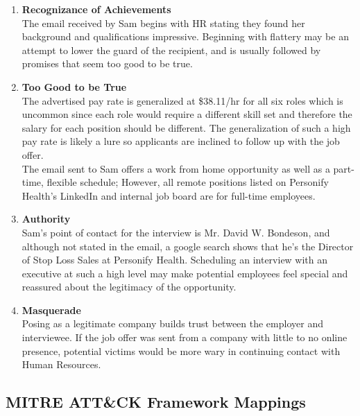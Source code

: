 \begin{fullwidth}
\begin{enumerate}
    \item \textbf{Recognizance of Achievements}
            \\\medskip
                The email received by Sam begins with HR stating they found her background and qualifications impressive. Beginning with flattery may be an attempt to lower the guard of the recipient, and is usually followed by promises that seem too good to be true.
    \item \textbf{Too Good to be True}
        \\\medskip
                The advertised pay rate is generalized at \$38.11/hr for all six roles which is uncommon since each role would require a different skill set and therefore the salary for each position should be different. The generalization of such a high pay rate is likely a lure so applicants are inclined to follow up with the job offer.
        \\\medskip
                The email sent to Sam offers a work from home opportunity as well as a part-time, flexible schedule; However, all remote positions listed on Personify Health's LinkedIn and internal job board are for full-time employees.
    \item \textbf{Authority}
        \\\medskip
                Sam's point of contact for the interview is Mr. David W. Bondeson, and although not stated in the email, a google search shows that he's the Director of Stop Loss Sales at Personify Health. Scheduling an interview with an executive at such a high level may make potential employees feel special and reassured about the legitimacy of the opportunity.
    \item \textbf{Masquerade}
        \\\medskip
                Posing as a legitimate company builds trust between the employer and interviewee. If the job offer was sent from a company with little to no online presence, potential victims would be more wary in continuing contact with Human Resources.
\end{enumerate}

\subsection{MITRE ATT\&CK Framework Mappings}


\end{fullwidth}
